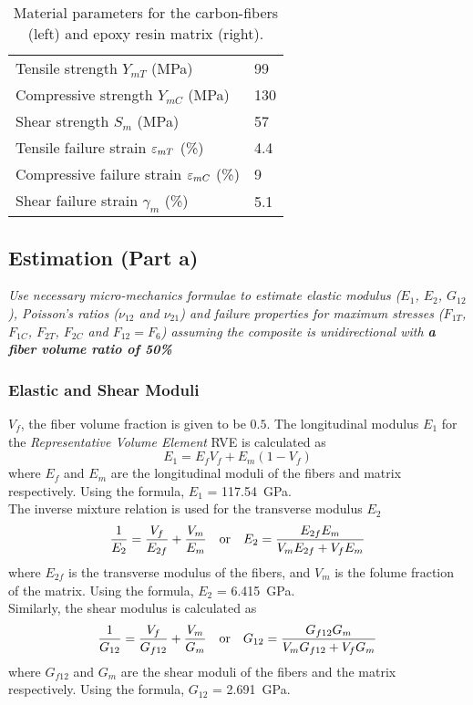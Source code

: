 \documentclass[a4paper,twosided,12pt,DIV12]{scrartcl}
\newcommand{\veps}{\vareps}
\begin{document}
\begin{table}[H]
\begin{minipage}{0.45\textwidth}
\begin{tabular}{p{}p{}}
    Tensile strength $Y_{mT}$ (MPa) & 99\\
    Compressive strength $Y_{mC}$ (MPa) & 130\\
    Shear strength $S_{m}$ (MPa) & 57\\
    Tensile failure strain $\veps_{mT}$ (\%) & 4.4\\
    Compressive failure strain $\veps_{mC}$ (\%) & 9\\
    Shear failure strain $\gamma_{m}$ (\%) & 5.1\\
    \bottomrule
  \end{tabular}
  \end{minipage}
  \caption{Material parameters for the carbon-fibers (left) and epoxy resin
    matrix (right).}
\end{table}
\subsection{Estimation (Part a)}

\textit{Use necessary micro-mechanics formulae to estimate elastic modulus
  ($E_{1}$, $E_{2}$,
$G_{12}$), Poisson's ratios ($\nu_{12}$ and $\nu_{21}$) and failure properties for maximum stresses
($F_{1T}$, $F_{1C}$, $F_{2T}$, $F_{2C}$ and $F_{12}=F_{6}$) assuming the composite is unidirectional
with \textbf{a fiber volume ratio of 50\%}}
\subsubsection{Elastic and Shear Moduli}
%
$V_f$, the fiber volume fraction  is given to be $0.5$. The longitudinal
modulus $E_1$ for the \emph{Representative Volume Element} RVE is calculated as
%
\begin{equation}
  E_1 = E_fV_f + E_m (1-V_f)
\end{equation}
%
where $E_f$ and $E_m$ are the longitudinal moduli of the fibers and matrix
respectively. Using the formula, $E_1$ = \SI{117.54}{GPa}.
%
\\The inverse mixture relation is used for the transverse modulus $E_2$
%
\begin{equation}
  \frac{1}{E_2} = \frac{V_f}{E_{2f}} + \frac{V_m}{E_m}
  \quad\textup{or}\quad
  E_2 = \frac{E_{2f} E_m}{V_mE_{2f}+V_fE_m}
\end{equation}
%
where $E_{2f}$ is the transverse modulus of the fibers, and $V_m$ is the folume
fraction of the matrix. Using the formula, $E_2$ = \SI{6.415}{GPa}.
\\Similarly, the shear modulus is calculated as
%
\begin{equation}
  \frac{1}{G_{12}} = \frac{V_f}{G_{f12}} + \frac{V_m}{G_m}
  \quad\textup{or}\quad
  G_{12} = \frac{G_{f12} G_m}{V_mG_{f12}+V_fG_m}
\end{equation}
%
where $G_{f12}$ and $G_m$ are the shear moduli of the fibers and the matrix
respectively. Using the formula, $G_{12}$ = \SI{2.691}{GPa}.
%
\end{document}
